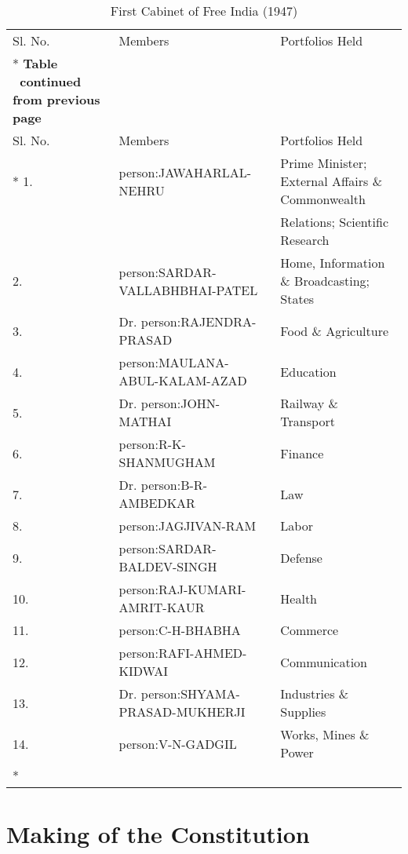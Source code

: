 \begin{longtable}[c]{@{}|p{1cm}|p{4cm}|p{7cm}|@{}}
	\caption{First Cabinet of Free India (1947)}
	\label{table:CH0102}\\
	\toprule
	Sl. No. & Members & Portfolios Held \\* \midrule
	\endfirsthead
	\multicolumn{3}{c}%
	{{\bfseries Table \thetable\ continued from previous page}} \\
	\toprule
	Sl. No. & Members & Portfolios Held \\* \midrule
	\endhead
	\bottomrule
	\endfoot
	\endlastfoot
	1. & \gls{person:JAWAHARLAL-NEHRU} & Prime Minister; External Affairs \& Commonwealth \\
	&                           & Relations; Scientific Research \\
	2. & \gls{person:SARDAR-VALLABHBHAI-PATEL} & Home, Information \& Broadcasting; States \\
	3. & Dr. \gls{person:RAJENDRA-PRASAD} & Food \& Agriculture \\
	4. & \gls{person:MAULANA-ABUL-KALAM-AZAD} & Education \\
	5. & Dr. \gls{person:JOHN-MATHAI} & Railway \& Transport \\
	6. & \gls{person:R-K-SHANMUGHAM} & Finance \\
	7. & Dr. \gls{person:B-R-AMBEDKAR} & Law \\
	8. & \gls{person:JAGJIVAN-RAM} & Labor \\
	9. & \gls{person:SARDAR-BALDEV-SINGH} & Defense \\
	10. & \gls{person:RAJ-KUMARI-AMRIT-KAUR} & Health \\
	11. & \gls{person:C-H-BHABHA} & Commerce \\
	12. & \gls{person:RAFI-AHMED-KIDWAI} & Communication \\
	13. & Dr. \gls{person:SHYAMA-PRASAD-MUKHERJI} & Industries \& Supplies \\
	14. & \gls{person:V-N-GADGIL} & Works, Mines \& Power \\* \bottomrule
\end{longtable}

\printendnotes
\cleardoublepage

%

\chapter{Making of the Constitution}

